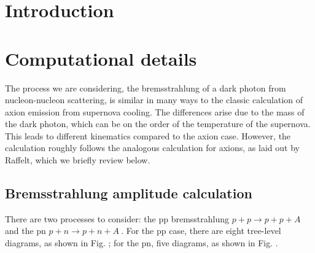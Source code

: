 \documentclass[10pt,a4paper]{article}
\begin{document}
		
	\section{Introduction}
	\section{Computational details}
	The process we are considering, the bremsstrahlung of a dark photon from nucleon-nucleon scattering, is similar in many ways to the classic calculation of axion emission from supernova cooling. The differences arise due to the mass of the dark photon, which can be on the order of the temperature of the supernova.  This leads to different kinematics compared to the axion case.  However, the calculation roughly follows the analogous calculation for axions, as laid out by Raffelt, which we briefly review below. 
	\subsection{Bremsstrahlung amplitude calculation}
	 There are two processes to consider: the pp bremsstrahlung $ p+p \rightarrow p+p+A$ and the pn $ p+n \rightarrow p+n+A\ $. For the pp case, there are eight tree-level diagrams, as shown in Fig. ; for the pn, five diagrams, as shown in Fig. . \newline
	
\end{document}
